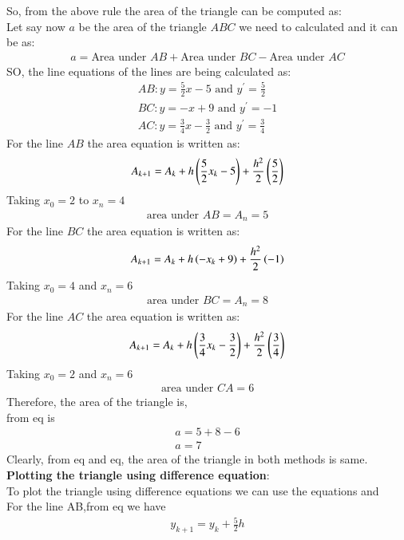 \documentclass[journal]{IEEEtran}
\begin{document}
So, from the above rule the area of the triangle can be computed as:
\\Let say now $a$ be the area of the triangle $ABC$ we need to calculated and it can be as:
\begin{align}
a=\text{Area under } AB + \text{Area under }BC - \text{Area under }AC
\end{align}
SO, the line equations of the lines are being calculated as:
\begin{align}
    AB:y=\frac{5}{2}x-5 \text{ and } y^\prime=\frac{5}{2}\\BC:y=-x+9\text{ and } y^\prime=-1\\AC:y=\frac{3}{4}x-\frac{3}{2} \text{ and }y^\prime=\frac{3}{4}
\end{align}
For the line $AB$ the area equation is written as:
\begin{align}
    A_{k+1}=A_k+h\left(\frac{5}{2}x_k-5\right)+\frac{h^2}{2}\left(\frac{5}{2}\right)
\end{align}
Taking $x_0=2$ to $x_n=4$
\begin{align}
    \text{area under }AB=A_n=5
\end{align}
For the line $BC$ the area equation is written as:
\begin{align}
    A_{k+1}=A_k+h\left(-x_k+9\right)+\frac{h^2}{2}\left(-1\right)
\end{align}
Taking $x_0=4$ and $x_n=6$
\begin{align}
    \text{area under }BC=A_n=8
\end{align}
For the line $AC$ the area equation is written as:
\begin{align}
    A_{k+1}=A_k+h\left(\frac{3}{4}x_k-\frac{3}{2}\right)+\frac{h^2}{2}\left(\frac{3}{4}\right)
\end{align}
Taking $x_0=2$ and $x_n=6$
\begin{align}
    \text{area under }CA=6
\end{align}
Therefore, the area of the triangle is,\\from eq  is
\begin{align}
    a=5+8-6\\a=7
\end{align}
Clearly, from eq and eq, the area of the triangle in both methods is same.
\textbf{Plotting the triangle using difference equation}:\\
To plot the triangle using difference equations we can use the equations  and \\For the line AB,from eq we have
\begin{align}
    y_{k+1}=y_k+\frac{5}{2}h
\end{align}
\end{document}
